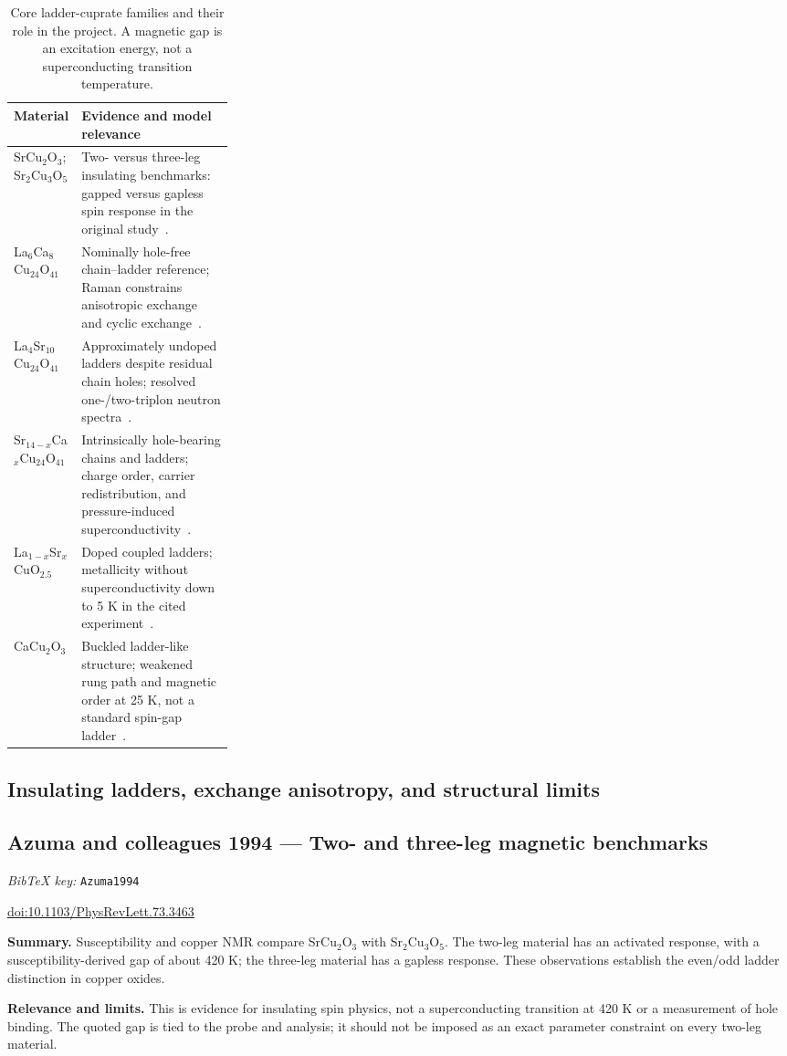 \documentclass[11pt]{article}
\newcommand{\paper}[2]{\Needspace{8\baselineskip}\subsection{#2}\label{paper:#1}\textit{BibTeX key:} \texttt{#1}\quad\citep{#1}\par}
\newcommand{\doi}[1]{\href{https://doi.org/#1}{doi:#1}}
\newcommand{\summary}{\par\textbf{Summary.} }
\newcommand{\relevance}{\par\textbf{Relevance and limits.} }
\begin{document}
\begin{table}[htbp]
\centering\small
\caption{Core ladder-cuprate families and their role in the project. A magnetic
gap is an excitation energy, not a superconducting transition temperature.}
\label{tab:material-map}
\begin{tabularx}{\linewidth}{@{}p{0.28\linewidth}X@{}}
\toprule
Material & Evidence and model relevance \\
\midrule
SrCu$_2$O$_3$; Sr$_2$Cu$_3$O$_5$ & Two- versus three-leg insulating benchmarks: gapped versus gapless spin response in the original study~\citep{Azuma1994}. \\
La$_6$Ca$_8$Cu$_{24}$O$_{41}$ & Nominally hole-free chain--ladder reference; Raman constrains anisotropic exchange and cyclic exchange~\citep{Nucker2000,Schmidt2005}. \\
La$_4$Sr$_{10}$Cu$_{24}$O$_{41}$ & Approximately undoped ladders despite residual chain holes; resolved one-/two-triplon neutron spectra~\citep{Notbohm2007}. \\
Sr$_{14-x}$Ca$_x$Cu$_{24}$O$_{41}$ & Intrinsically hole-bearing chains and ladders; charge order, carrier redistribution, and pressure-induced superconductivity~\citep{Uehara1996,Abbamonte2004,Nucker2000}. \\
La$_{1-x}$Sr$_x$CuO$_{2.5}$ & Doped coupled ladders; metallicity without superconductivity down to 5 K in the cited experiment~\citep{Hiroi1995,NormandRice1996}. \\
CaCu$_2$O$_3$ & Buckled ladder-like structure; weakened rung path and magnetic order at 25 K, not a standard spin-gap ladder~\citep{Kiryukhin2001}. \\
\bottomrule
\end{tabularx}
\end{table}

\subsection*{Insulating ladders, exchange anisotropy, and structural limits}

\paper{Azuma1994}{Azuma and colleagues 1994 --- Two- and three-leg magnetic benchmarks}
\doi{10.1103/PhysRevLett.73.3463}
\summary Susceptibility and copper NMR compare SrCu$_2$O$_3$ with Sr$_2$Cu$_3$O$_5$. The two-leg material has an activated response, with a susceptibility-derived gap of about 420 K; the three-leg material has a gapless response. These observations establish the even/odd ladder distinction in copper oxides.
\relevance This is evidence for insulating spin physics, not a superconducting transition at 420 K or a measurement of hole binding. The quoted gap is tied to the probe and analysis; it should not be imposed as an exact parameter constraint on every two-leg material.
\end{document}
